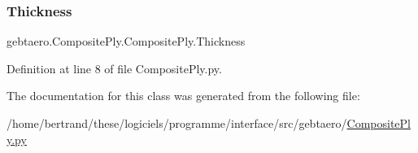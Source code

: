 \subsubsection{\texorpdfstring{Thickness}{Thickness}}
{\footnotesize\ttfamily gebtaero.\+Composite\+Ply.\+Composite\+Ply.\+Thickness}



Definition at line 8 of file Composite\+Ply.\+py.



The documentation for this class was generated from the following file\+:\begin{DoxyCompactItemize}
\item 
/home/bertrand/these/logiciels/programme/interface/src/gebtaero/\hyperlink{_composite_ply_8py}{Composite\+Ply.\+py}\end{DoxyCompactItemize}
